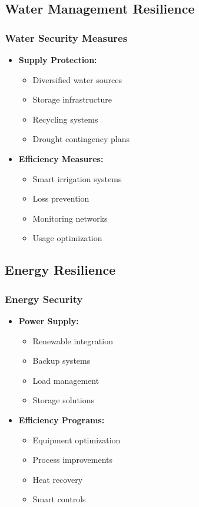 \subsection{Water Management Resilience}

\subsubsection{Water Security Measures}
\begin{itemize}
    \item \textbf{Supply Protection:}
    \begin{itemize}
        \item Diversified water sources
        \item Storage infrastructure
        \item Recycling systems
        \item Drought contingency plans
    \end{itemize}
    
    \item \textbf{Efficiency Measures:}
    \begin{itemize}
        \item Smart irrigation systems
        \item Loss prevention
        \item Monitoring networks
        \item Usage optimization
    \end{itemize}
\end{itemize}

\subsection{Energy Resilience}

\subsubsection{Energy Security}
\begin{itemize}
    \item \textbf{Power Supply:}
    \begin{itemize}
        \item Renewable integration
        \item Backup systems
        \item Load management
        \item Storage solutions
    \end{itemize}
    
    \item \textbf{Efficiency Programs:}
    \begin{itemize}
        \item Equipment optimization
        \item Process improvements
        \item Heat recovery
        \item Smart controls
    \end{itemize}
\end{itemize}


